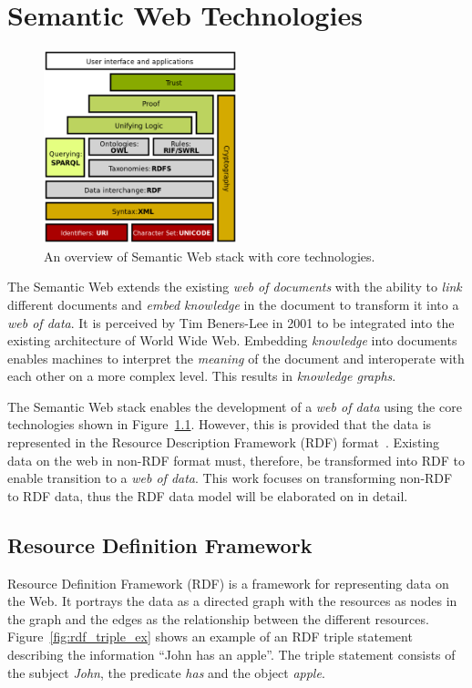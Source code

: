 \chapter{Semantic Web Technologies}
\label{chap:semantic_web}


\begin{figure}[htbp]
    \centering
    \includegraphics[width=0.5\textwidth]{fig/Semantic_web_stack.svg.png}
    \caption{An overview of Semantic Web stack with core technologies\cite{sem_web_stack}.}
    \label{fig:sem_web_stack}
\end{figure}

The Semantic Web extends the existing \emph{web of documents} with the ability 
to \emph{link} different documents and \emph{embed knowledge} in the document
to transform it into a \emph{web of data}. It is perceived by Tim Beners-Lee in 
2001\cite{bernerslee2001semantic} to be integrated into the existing architecture 
of World Wide Web. Embedding \emph{knowledge} into documents enables machines to
interpret the \emph{meaning} of the document and interoperate with each other on 
a more complex level. This results in \emph{knowledge graphs}. 

The Semantic Web stack enables the development of a \emph{web of data} using 
the core technologies shown in Figure~\ref{fig:sem_web_stack}. 
However, this is provided that the data is represented in the 
Resource Description Framework (RDF) format~\cite{rdf_concepts}. 
Existing data on the web in non-RDF format must, therefore, be transformed 
into RDF to enable transition to a \emph{web of data}. This work 
focuses on transforming non-RDF to RDF data, thus the RDF data model will be elaborated on
in detail. 



\section{Resource Definition Framework}
Resource Definition Framework (RDF) \cite{rdf_concepts} is a framework for representing data on the Web.
It portrays the data as a directed graph with the resources as nodes in the graph and the
edges as the relationship between the different resources.
Figure~\ref{fig:rdf_triple_ex} shows an example of an RDF triple statement describing
the information “John has an apple”.
The triple statement consists of the subject \textit{John}, the predicate \textit{has}
and the object \textit{apple}.

